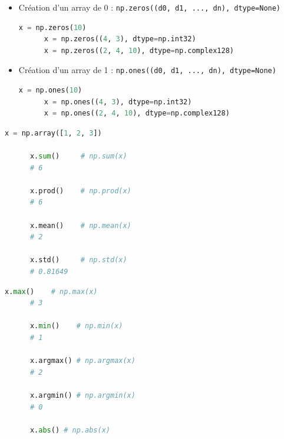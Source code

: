 \documentclass[aspectratio=169]{beamer}
\begin{document}
\begin{frame}[fragile]{}{}
  \vfill
  \begin{itemize}
  \item Création d'un array de 0 : \verb+np.zeros((d0, d1, ..., dn), dtype=None)+
    \begin{lstlisting}[language=Python]
      x = np.zeros(10)
      x = np.zeros((4, 3), dtype=np.int32)
      x = np.zeros((2, 4, 10), dtype=np.complex128)
    \end{lstlisting}

  \item Création d'un array de 1 : \verb+np.ones((d0, d1, ..., dn), dtype=None)+
    \begin{lstlisting}[language=Python]
      x = np.ones(10)
      x = np.ones((4, 3), dtype=np.int32)
      x = np.ones((2, 4, 10), dtype=np.complex128)
    \end{lstlisting}
  \end{itemize}
  \vfill
\end{frame}




\begin{frame}[fragile]{}{}
  \vfill
  \begin{minipage}{.48\textwidth}
    \begin{lstlisting}[language=Python]
      x = np.array([1, 2, 3])

      x.sum()     # np.sum(x)
      # 6
      
      x.prod()    # np.prod(x)
      # 6
      
      x.mean()    # np.mean(x)
      # 2
      
      x.std()     # np.std(x)
      # 0.81649
    \end{lstlisting}
  \end{minipage}%
  \hfill
  \begin{minipage}{.48\textwidth}
    \begin{lstlisting}[language=Python]
      x.max()    # np.max(x)
      # 3
      
      x.min()    # np.min(x)
      # 1
      
      x.argmax() # np.argmax(x)
      # 2
      
      x.argmin() # np.argmin(x)
      # 0

      x.abs() # np.abs(x)
    \end{lstlisting}
  \end{minipage}
  \vfill
\end{frame}
\end{document}
